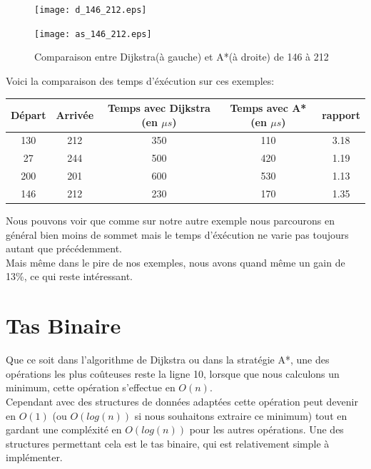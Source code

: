 \documentclass{article}
\begin{document}
\begin{figure}[!hbt]
		\begin{minipage}{0.45\textwidth}
			\centering
			\texttt{[image: d\_146\_212.eps]}
		\end{minipage}
		\begin{minipage}{0.45\textwidth}
			\centering
			\texttt{[image: as\_146\_212.eps]}
		\end{minipage}
		\caption{Comparaison entre Dijkstra(à gauche) et A*(à droite) de 146 à 212}
		\label{vs_3}
\end{figure}


Voici la comparaison des temps d'éxécution sur ces exemples:\\

\begin{center}
\begin{tabular}{| c | c | c | c | c |}
	\hline
	 Départ & Arrivée & Temps avec Dijkstra (en $\mu s$)& Temps avec A*(en $\mu s$) & rapport \\ \hline
	 130 & 212 & 350 & 110 & 3.18 \\ \hline
	 27 & 244 & 500 & 420 & 1.19\\ \hline
	 200 & 201 & 600 & 530 & 1.13 \\ \hline
	 146 & 212 & 230 & 170 & 1.35 \\ \hline
\end{tabular}
\end{center}

Nous pouvons voir que comme sur notre autre exemple nous parcourons en général bien moins de 
sommet mais le temps d'éxécution ne varie pas toujours autant que précédemment.\\
Mais même dans le pire de nos exemples, nous avons quand même un gain de 13\%, ce qui
reste intéressant.

\clearpage
\section{Tas Binaire}

Que ce soit dans l'algorithme de Dijkstra ou dans la stratégie A*, une des opérations les 
plus coûteuses reste la ligne 10, lorsque que nous calculons un minimum, cette opération
s'effectue en $O(n)$.\\
Cependant avec des structures de données adaptées cette opération peut devenir en $O(1)$ (ou
$O(log(n))$ si nous souhaitons extraire ce minimum)
tout en gardant une compléxité en $O(log(n))$ pour les autres opérations. Une des structures
permettant cela est le tas binaire, qui est relativement simple à implémenter.\\
\end{document}
